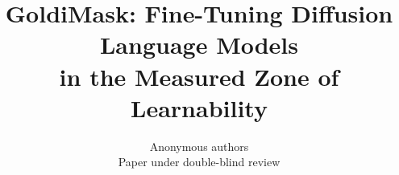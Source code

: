 \documentclass{article} %
\title{GoldiMask: Fine-Tuning Diffusion Language Models\\in the Measured Zone of Learnability}
\author{Anonymous authors\\
Paper under double-blind review}
\begin{document}
\maketitle

\begin{abstract}
\end{abstract}
\end{document}
